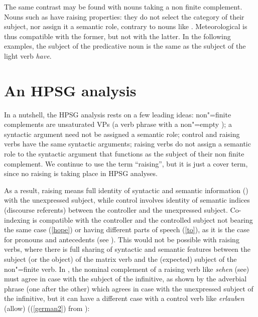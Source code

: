\documentclass[output=paper
	        ,collection
	        ,collectionchapter
 	        ,biblatex
                ,babelshorthands
                ,newtxmath
                ,draftmode
                ,colorlinks, citecolor=brown
]{langscibook}
\begin{document}
\eal
{}
\zl

The same contrast may be found with  nouns taking a non finite complement. Nouns such as  have raising properties: they do not select the category of their subject, nor assign it a semantic role, contrary to nouns like . Meteorological  is thus compatible with the former, but not with the latter. In the following examples, the subject of the predicative noun is the same as the subject of the light verb \emph{have}.


\eal
{}
\zl

\section{An HPSG analysis}


In a nutshell, the HPSG analysis rests on a few leading ideas: non"=finite complements are unsaturated VPs (a verb phrase with a non"=empty \subjl); a syntactic argument need not be assigned a semantic role; control and raising verbs have the same syntactic arguments; raising verbs do not assign a semantic role to the syntactic argument that functions as the subject of their non finite complement. We continue to use the term ``raising'', but it is just a cover term, since no raising is taking place in HPSG analyses.

As a result,  raising means full identity of syntactic and semantic information ()  with the unexpressed subject, while control involves identity of semantic indices (discourse referents) between the controller and the unexpressed subject. Co-indexing is compatible with the controller and the controlled subject not bearing the same case (\ref{hope}) or having different parts of speech (\ref{to}), as it is the case for pronouns and antecedents (see ). This would not be possible with raising verbs, where there is full sharing of syntactic and semantic features between the subject (or the object) of the matrix verb and the (expected) subject of the non"=finite verb. In , the nominal complement of a raising verb like \emph{sehen} (see) must agree in case with the subject of the infinitive, as shown by the adverbial phrase (one after the other) which agrees in case with the unexpressed subject of the infinitive, but it can have a different case with a control verb like \emph{erlauben} (allow) ((\ref{german2}) from ):
\end{document}
